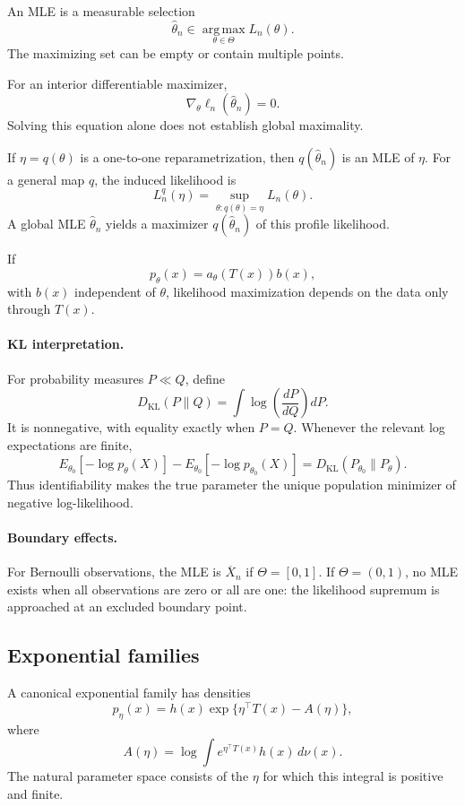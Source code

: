 An MLE is a measurable selection
\[
\widehat\theta_n\in
\operatorname*{arg\,max}_{\theta\in\Theta}L_n(\theta).
\]
The maximizing set can be empty or contain multiple points.

For an interior differentiable maximizer,
\[
\nabla_\theta\ell_n(\widehat\theta_n)=0.
\]
Solving this equation alone does not establish global maximality.

If $\eta=q(\theta)$ is a one-to-one reparametrization, then
$q(\widehat\theta_n)$ is an MLE of $\eta$. For a general map $q$,
the induced likelihood is
\[
L_n^q(\eta)=
\sup_{\theta:q(\theta)=\eta}L_n(\theta).
\]
A global MLE $\widehat\theta_n$ yields a maximizer
$q(\widehat\theta_n)$ of this profile likelihood.

If
\[
p_\theta(x)=a_\theta(T(x))b(x),
\]
with $b(x)$ independent of $\theta$, likelihood maximization depends
on the data only through $T(x)$.

\paragraph{KL interpretation.}
For probability measures $P\ll Q$, define
\[
D_{\mathrm{KL}}(P\|Q)
=
\int\log\left(\frac{dP}{dQ}\right)dP.
\]
It is nonnegative, with equality exactly when $P=Q$.
Whenever the relevant log expectations are finite,
\[
E_{\theta_0}[-\log p_\theta(X)]
-
E_{\theta_0}[-\log p_{\theta_0}(X)]
=
D_{\mathrm{KL}}(P_{\theta_0}\|P_\theta).
\]
Thus identifiability makes the true parameter the unique population
minimizer of negative log-likelihood.

\paragraph{Boundary effects.}
For Bernoulli observations, the MLE is $\overline X_n$ if
$\Theta=[0,1]$. If $\Theta=(0,1)$, no MLE exists when all observations
are zero or all are one: the likelihood supremum is approached at
an excluded boundary point.

\subsection{Exponential families}

A canonical exponential family has densities
\[
p_\eta(x)
=
h(x)\exp\{\eta^\top T(x)-A(\eta)\},
\]
where
\[
A(\eta)=
\log\int e^{\eta^\top T(x)}h(x)\,d\nu(x).
\]
The natural parameter space consists of the $\eta$ for which this
integral is positive and finite.

